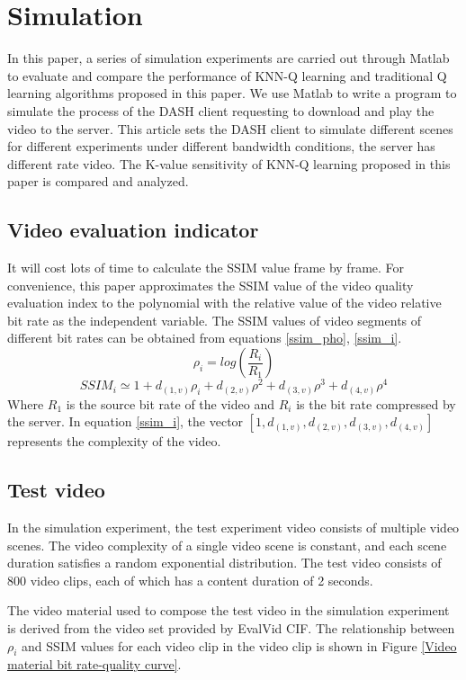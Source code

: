 \documentclass[twocolumn]{article}
\begin{document}
\section{Simulation}
In this paper, a series of simulation experiments are carried out through Matlab to 
evaluate and compare the performance of KNN-Q learning and traditional Q learning 
algorithms proposed in this paper. We use Matlab to write a program to 
simulate the process of the DASH client requesting to download and play the video to the server.
 This article sets the DASH client to simulate different scenes for different experiments 
 under different bandwidth conditions, the server has different rate video. 
 The K-value sensitivity of KNN-Q learning proposed in this paper is compared and analyzed.
\subsection{Video evaluation indicator}
It will cost lots of time to calculate the SSIM value frame by frame.
For convenience, this paper approximates the SSIM value of the 
video quality evaluation index to the polynomial \cite{RN19} with the relative 
value of the video relative bit rate as the independent variable. 
The SSIM values of video segments of different bit rates can be obtained from equations \ref{ssim_pho}, \ref{ssim_i}.
\begin{equation}
\label{ssim_pho}
\rho_{i}=log\left(\frac{R_{i}}{R_{1}}\right)
\end{equation}
\begin{equation}
\label{ssim_i}
SSIM_{i}\simeq1+d_{(1,v)}\rho_{i}+d_{(2,v)}\rho^2+d_{(3,v)}\rho^3+d_{(4,v)}\rho^4
\end{equation}
Where $R_{1}$ is the source bit rate of the video and $R_{i}$ is the bit rate compressed by the server. 
In equation \ref{ssim_i}, the vector $\left[1,d_{(1,v)},d_{(2,v)},d_{(3,v)},d_{(4,v)}\right]$ 
represents the complexity of the video.
\subsection{Test video}
In the simulation experiment, the test experiment video consists of multiple video scenes. 
The video complexity of a single video scene is constant, and each scene duration satisfies 
a random exponential distribution. The test video consists of 800 video clips, 
each of which has a content duration of 2 seconds.

The video material used to compose the test video in the simulation experiment is 
derived from the video set \cite{RN20} provided by EvalVid CIF.
The relationship between $\rho_{i}$ and SSIM values for each video clip in the 
video clip is shown in Figure \ref{Video material bit rate-quality curve}.
\end{document}
